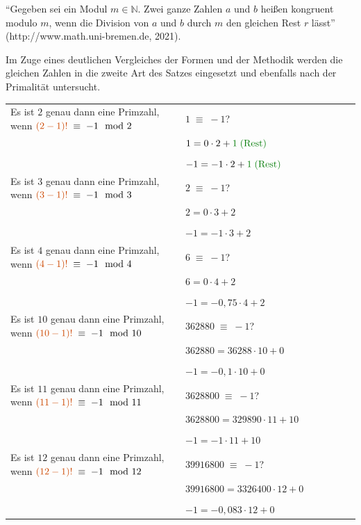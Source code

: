 \begin{definition}[Kongruenz]
``Gegeben sei ein Modul $m \in \mathbb{N}$. Zwei ganze
Zahlen $a$ und $b$ heißen kongruent modulo $m$, wenn die
Division von $a$ und $b$ durch $m$ den gleichen Rest $r$
lässt'' (http://www.math.uni-bremen.de, 2021).
\end{definition}

Im Zuge eines deutlichen Vergleiches der Formen und der
Methodik werden die gleichen Zahlen in die zweite Art
des Satzes eingesetzt und ebenfalls nach der Primalität
untersucht.

\begin{table}[H]
 \begin{tabular}{| p{0.5\linewidth} | p{0.5\linewidth} |}
  \hline
  Es ist $2$ genau dann eine Primzahl, wenn ${\color{DarkOrange} (2-1)!} \;\equiv\; -1 \mod 2$
  & $1 \;\equiv\; -1$? \\
  & $1=0\cdot 2 + {\color{DarkGreen} 1 \;\text{(Rest)}}$ \\
  & \\
  & $-1 = -1 \cdot 2 + {\color{DarkGreen} 1 \;\text{(Rest)}}$\\
  \hline
  Es ist $3$ genau dann eine Primzahl, wenn ${\color{DarkOrange} (3-1)!} \;\equiv\; -1 \mod 3$
  & $2 \;\equiv\; -1$? \\
  & $2=0\cdot 3 + 2$ \\
  & \\
  & $-1 = -1 \cdot 3 + 2$\\
  \hline
  \rowcolor{LightRed}
  Es ist $4$ genau dann eine Primzahl, wenn ${\color{DarkOrange} (4-1)!} \;\equiv\; -1 \mod 4$
  & $6 \;\equiv\; -1$? \\\rowcolor{LightRed}
  & $6=0\cdot 4 + 2$ \\\rowcolor{LightRed}
  & \\\rowcolor{LightRed}
  & $-1 = -0,75 \cdot 4 + 2$\\
  \hline
  \rowcolor{LightRed}
  Es ist $10$ genau dann eine Primzahl, wenn ${\color{DarkOrange} (10-1)!} \;\equiv\; -1 \mod 10$
  & $362880 \;\equiv\; -1$? \\\rowcolor{LightRed}
  & $362880=36288\cdot 10 + 0$ \\\rowcolor{LightRed}
  & \\\rowcolor{LightRed}
  & $-1 = -0,1 \cdot 10 + 0$\\
  \hline
  Es ist $11$ genau dann eine Primzahl, wenn ${\color{DarkOrange} (11-1)!} \;\equiv\; -1 \mod 11$
  & $3628800 \;\equiv\; -1$? \\
  & $3628800=329890\cdot 11 + 10$ \\
  & \\
  & $-1 = -1 \cdot 11 + 10$\\
  \hline
  \rowcolor{LightRed}
  Es ist $12$ genau dann eine Primzahl, wenn ${\color{DarkOrange} (12-1)!} \;\equiv\; -1 \mod 12$
  & $39916800 \;\equiv\; -1$? \\\rowcolor{LightRed}
  & $39916800=3326400\cdot 12 + 0$ \\\rowcolor{LightRed}
  & \\\rowcolor{LightRed}
  & $-1 = -0,083 \cdot 12 + 0$\\
  \hline
 \end{tabular}
\end{table}

